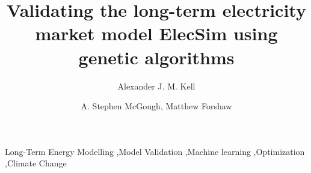 \documentclass[final,3p,times,twocolumn,numbers]{elsarticle}
\begin{document}
\begin{frontmatter}


 \title{Validating the long-term electricity market model ElecSim using genetic algorithms}
 \author{Alexander J. M. Kell}



\author{A. Stephen McGough, Matthew Forshaw}

\address{School of Computing, Newcastle University, Newcastle-upon-Tyne, United Kingdom}

\begin{abstract}

\end{abstract}
%
%

\begin{keyword}
Long-Term Energy Modelling \sep Model Validation \sep Machine learning \sep Optimization \sep Climate Change


\end{keyword}

\end{frontmatter}
\end{document}

